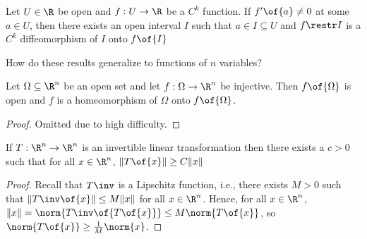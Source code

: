 \begin{corollary}
    Let $U \in \R$ be open and $f: U \to \R$ be a $C^k$ function. If $f'\of{a} \neq 0$ at some $a \in U$, then there exists an open interval $I$ such that $a \in I \subseteq U$ and $f \restr I$ is a $C^k$ diffeomorphism of $I$ onto $f\of{I}$
\end{corollary}

How do these results generalize to functions of $n$ variables?

\begin{theorem}
    Let $\Omega \subseteq \R^n$ be an open set and let $f: \Omega \to \R^n$ be injective. Then $f\of{\Omega}$ is open and $f$ is a homeomorphism of $\Omega$ onto $f\of{\Omega}$.
\end{theorem}
\begin{proof}
    Omitted due to high difficulty.
\end{proof}

\begin{lemma}
    If $T: \R^n \to \R^n$ is an invertible linear transformation then there exists a $c > 0$ such that for all $x \in \R^n$, $\Vert T\of{x} \Vert \geq C\Vert x \Vert$
\end{lemma}
\begin{proof}
    Recall that $T\inv$ is a Lipschitz function, i.e., there exists $M > 0$ such that $\Vert T\inv\of{x} \Vert \leq M \Vert x \Vert$ for all $x \in \R^n$. Hence, for all $x \in \R^n$, $\Vert x \Vert = \norm{T\inv\of{T\of{x}}} \leq M \norm{T\of{x}}$, so $\norm{T\of{x}} \geq \frac{1}{M} \norm{x}$.
\end{proof}

